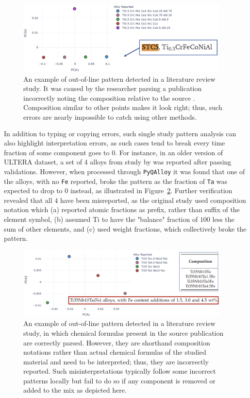\begin{figure}[H]
    \centering
    \includegraphics[width=0.95\textwidth]{pyqalloy/pyqalloy_HumanError.png}
    \caption{An example of out-of-line pattern detected in a literature review study. It was caused by the researcher parsing a publication incorrectly noting the composition relative to the source \cite{Wang2009AtomicAlloy}. Composition similar to other points makes it look right; thus, such errors are nearly impossible to catch using other methods.}
    \label{pyqalloy:fig:patternbreak1}
\end{figure}


In addition to typing or copying errors, such single study pattern analysis can also highlight interpretation errors, as such cases tend to break every time fraction of some component goes to $0$. For instance, in an older version of ULTERA dataset, a set of 4 alloys from study by \citet{Amigo2019MechanicalApplications} was reported after passing validations. However, when processed through \texttt{PyQAlloy} it was found that one of the alloys, with no \texttt{Fe} reported, broke the pattern as the fraction of \texttt{Ta} was expected to drop to $0$ instead, as illustrated in Figure~\ref{pyqalloy:fig:patternbreak2}. Further verification revealed that all 4 have been misreported, as the original study used composition notation which (a) reported atomic fractions as prefix, rather than suffix of the element symbol, (b) assumed Ti to have the "balance" fraction of $100$ less the sum of other elements, and (c) used weight fractions, which collectively broke the pattern.


\begin{figure}[H]
    \centering
    \includegraphics[width=0.95\textwidth]{pyqalloy/pyqalloy_CompositionNotation.png}
    \caption{An example of out-of-line pattern detected in a literature review study, in which chemical formulas present in the source publication \cite{Amigo2019MechanicalApplications} are correctly parsed. However, they are shorthand composition notations rather than actual chemical formulas of the studied material and need to be interpreted; thus, they are incorrectly reported. Such misinterpretations typically follow some incorrect patterns locally but fail to do so if any component is removed or added to the mix as depicted here.}
    \label{pyqalloy:fig:patternbreak2}
\end{figure}


